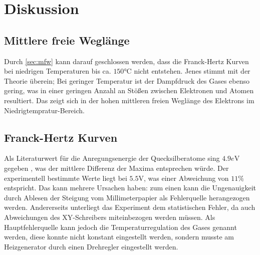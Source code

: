 \section{Diskussion}
\label{sec:Diskussion}

\subsection{Mittlere freie Weglänge}
Durch \autoref{sec:mfw} kann darauf geschlossen werden, dass die Franck-Hertz
Kurven bei niedrigen Temperaturen bis ca. $150 \unit{\celsius}$ nicht entstehen. 
Jenes stimmt mit der Theorie überein; Bei geringer Temperatur ist der Dampfdruck 
des Gases ebenso gering, was in einer geringen Anzahl an Stößen zwischen 
Elektronen und Atomen resultiert.
Das zeigt sich in der hohen mittleren freien Weglänge des Elektrons im
Niedrigtempratur-Bereich.

\subsection{Franck-Hertz Kurven}
Als Literaturwert für die Anregungsenergie der Quecksilberatome sing 
$4.9 \unit{e\volt}$ gegeben \cite{anregung}, was der mittlere Differenz der
Maxima entsprechen würde.
Der experimentell bestimmte Werte liegt bei $5.5 \unit{\volt}$, was einer Abweichung
von $11 \%$ entspricht. Das kann mehrere Ursachen haben: zum einen kann die
Ungenauigkeit durch Ablesen der Steigung vom Millimeterpapier als 
Fehlerquelle herangezogen werden. Andererseits unterliegt das Experiment dem
statistischen Fehler, da auch Abweichungen des XY-Schreibers miteinbezogen 
werden müssen. Als Hauptfehlerquelle kann jedoch die Temperaturregulation des 
Gases genannt werden, diese konnte nicht konstant eingestellt werden, sondern 
musste am Heizgenerator durch einen Drehregler eingestellt werden.